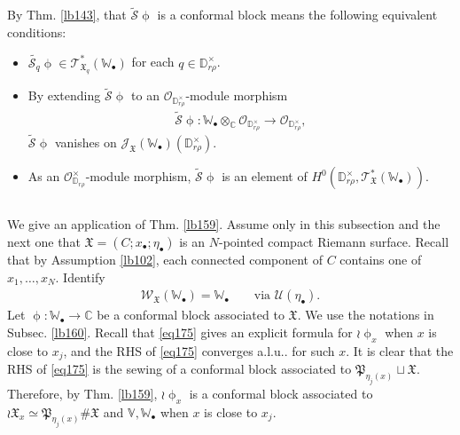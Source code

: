 \documentclass[11pt,b5paper,notitlepage]{article}
\theoremstyle{definition}
\theoremstyle{plain}
\newcommand{\fk}{\mathfrak}
\newcommand{\mc}{\mathcal}
\newcommand{\wtd}{\widetilde}
\newcommand{\scr}{\mathscr}
\newcommand{\blt}{\bullet}
\newcommand{\Vbb}{\mathbb V}
\newcommand{\Wbb}{\mathbb W}
\newcommand{\Cbb}{\mathbb C}
\newcommand{\Dbb}{\mathbb D}
\numberwithin{equation}{section}
\begin{document}
By Thm. \ref{lb143}, that $\wtd{\mc S}\upphi$ is a conformal block means the following equivalent conditions:
\begin{itemize}
\item $\wtd{\mc S_q}\upphi\in \scr T_{\fk X_q}^*(\Wbb_\blt)$ for each $q\in\Dbb_{r\rho}^\times$.
\item By extending $\wtd{\mc S}\upphi$  to an $\scr O_{\Dbb_{r\rho}^\times}$-module morphism
\begin{align}
\wtd{\mc S}\upphi:\Wbb_\blt\otimes_\Cbb\scr O_{\Dbb_{r\rho}^\times}\rightarrow \scr O_{\Dbb_{r\rho}^\times},\label{eq248}
\end{align}
$\wtd{\mc S}\upphi$ vanishes on $\scr J_{\fk X}(\Wbb_\blt)(\Dbb_{r\rho}^\times)$.
\item As an $\scr O_{\Dbb_{r\rho}}^\times$-module morphism, $\wtd{\mc S}\upphi$ is an element of $H^0(\Dbb_{r\rho}^\times,\scr T_{\fk X}^*(\Wbb_\blt))$.
\end{itemize}




\subsection{}

We give an application of Thm. \ref{lb159}. Assume only in this subsection and the next one that $\fk X=(C;x_\blt;\eta_\blt)$ is an $N$-pointed compact Riemann surface. Recall that by Assumption \ref{lb102}, each connected component of $C$ contains one of $x_1,\dots,x_N$. Identify
\begin{align}
\scr W_{\fk X}(\Wbb_\blt)=\Wbb_\blt\qquad\text{via }\mc U(\eta_\blt).\label{eq250}
\end{align}
Let $\upphi:\Wbb_\blt\rightarrow\Cbb$ be a conformal block associated to $\fk X$.  We use the notations in Subsec. \ref{lb160}. Recall that \eqref{eq175}  gives an explicit formula for $\wr\upphi_x$ when $x$ is close to $x_j$, and the RHS of \eqref{eq175} converges a.l.u.. for such $x$. It is clear that the RHS of \eqref{eq175} is the sewing of a conformal block associated to $\fk P_{\eta_j(x)}\sqcup \fk X$. Therefore, by Thm. \ref{lb159}, $\wr\upphi_x$ is a conformal block associated to $\wr\fk X_x\simeq \fk P_{\eta_j(x)}\#\fk X$ and $\Vbb,\Wbb_\blt$ when $x$ is close to $x_j$.
\end{document}
